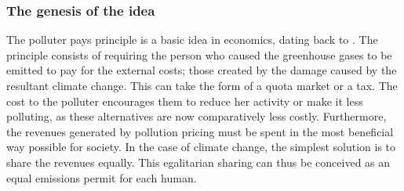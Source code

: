 \documentclass[a5paper,english,openany]{memoir}
\begin{document}
\subsubsection*{The genesis of the idea}
The polluter pays principle is a basic idea in economics, dating back to \citet{pigou_economics_1920}. The principle consists of %
requiring the person who caused the greenhouse gases to be emitted to pay for the external costs; those created by the damage caused by the resultant climate change.  %
This can take the form of a quota market or a tax. The cost to the polluter encourages them %
to reduce her activity or make it less polluting, as these alternatives are now comparatively less costly. %
Furthermore, the revenues generated by pollution pricing must be spent in the most beneficial way possible for society.  
In the case of climate change, the simplest solution is %
to share the revenues equally. This egalitarian sharing can thus be conceived as an equal emissions permit for each human. 
\end{document}
